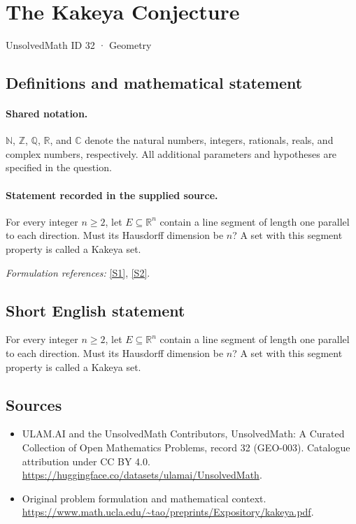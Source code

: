 \documentclass[11pt]{article}
\newcommand{\sref}[2]{\hyperlink{source:#1:#2}{[S#2]}}
\begin{document}
\setcounter{section}{31}
\section{The Kakeya Conjecture}\label{32}
{\small UnsolvedMath ID 32 · Geometry}
\subsection{Definitions and mathematical statement}

\paragraph{Shared notation.}$\mathbb N$, $\mathbb Z$, $\mathbb Q$, $\mathbb R$, and $\mathbb C$ denote the natural numbers, integers, rationals, reals, and complex numbers, respectively. All additional parameters and hypotheses are specified in the question.


\paragraph{Statement recorded in the supplied source.}
For every integer $n\geq2$, let $E\subseteq\mathbb R^n$ contain a line segment of length one parallel to each direction. Must its Hausdorff dimension be $n$? A set with this segment property is called a Kakeya set.
\par\smallskip\textit{Formulation references:} \sref{32}{1}, \sref{32}{2}.
\subsection{Short English statement}
For every integer $n\geq2$, let $E\subseteq\mathbb R^n$ contain a line segment of length one parallel to each direction. Must its Hausdorff dimension be $n$? A set with this segment property is called a Kakeya set.
\subsection{Sources}
\begin{itemize}
\item[\hypertarget{source:32:1}{S1}] ULAM.AI and the UnsolvedMath Contributors, UnsolvedMath: A Curated Collection of Open Mathematics Problems, record 32 (GEO-003). Catalogue attribution under CC BY 4.0.
\url{https://huggingface.co/datasets/ulamai/UnsolvedMath}.
\item[\hypertarget{source:32:2}{S2}] Original problem formulation and mathematical context.
\url{https://www.math.ucla.edu/~tao/preprints/Expository/kakeya.pdf}.
\end{itemize}
\label{end:32}
\end{document}
